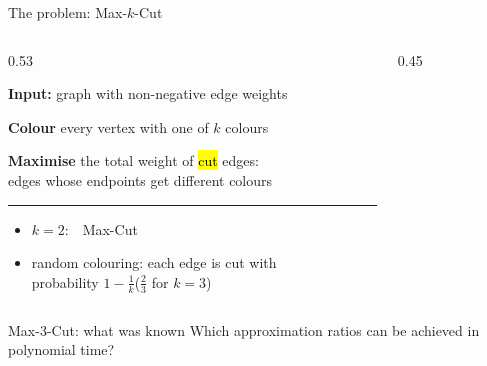 \begin{frame}{The problem: Max-$k$-Cut}
\begin{columns}[T,onlytextwidth]
\begin{column}{0.53\textwidth}
\raggedright
\vspace{6mm}
\textbf{Input:} graph with non-negative edge weights\par
\vspace{4mm}
\textbf{Colour} every vertex with one of $k$ colours\par
\vspace{4mm}
\textbf{Maximise} the total weight of \hl{cut} edges:\\
edges whose endpoints get different colours\par
\vspace{6.5mm}
{\color{acc!35}\rule{0.94\linewidth}{0.5pt}}\par
\vspace{3mm}
\begin{itemize}\setlength{\itemsep}{2.5mm}
\item $k=2$:\ \ Max-Cut
\item random colouring: each edge is cut with\\ probability $1-\frac1k$\quad ($\frac23$ for $k=3$)
\end{itemize}
\end{column}
\begin{column}{0.45\textwidth}
\centering
\vspace{2mm}

\end{column}
\end{columns}
\end{frame}

\begin{frame}{Max-3-Cut: what was known}
\vspace{2mm}
Which approximation ratios can be achieved in polynomial time?
\vfill
\centering

\vfill
\end{frame}


